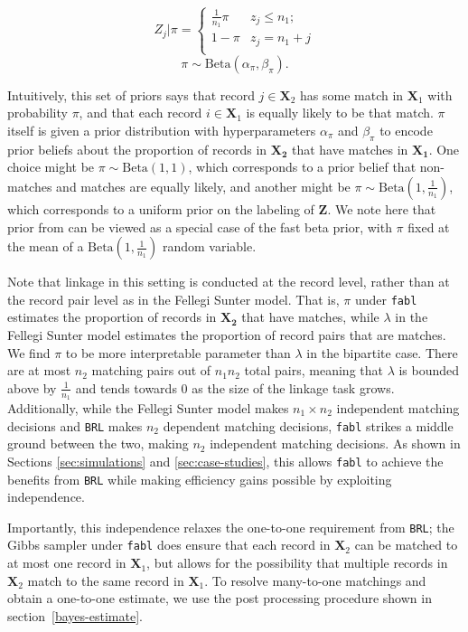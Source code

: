 \documentclass[ba]{imsart}
\begin{document}
$$Z_j | \pi =
\begin{cases} 
	\frac{1}{n_1}\pi  & z_j \leq n_1; \\
	1-\pi &  z_j  = n_1 + j \\
\end{cases}$$
$$\pi \sim \text{Beta}(\alpha_{\pi}, \beta_{\pi}).$$

Intuitively, this set of priors says that record $j \in \bm{X}_2$ has some match in $\bm{X}_1$ with probability $\pi$, and that each record $i \in \bm{X}_1$ is equally likely to be that match. $\pi$ itself is given a prior distribution with hyperparameters $\alpha_{\pi}$ and $\beta_{\pi}$ to encode prior beliefs about  the proportion of records in $\bm{X_2}$ that have matches in $\bm{X_1}$. One choice might be \(\pi \sim \text{Beta}(1, 1)\), which corresponds to a prior belief that non-matches and matches are equally likely, and another might be \(\pi \sim \text{Beta}\left(1, \frac{1}{n_1}\right)\), which corresponds to a uniform prior on the labeling of \(\bm{Z}\). We note here that prior from \cite{wortman2019} can be viewed as a special case of the fast beta prior, with $\pi$ fixed at the mean of a $\text{Beta}\left(1, \frac{1}{n_1}\right)$ random variable. 

Note that linkage in this setting is conducted at the record level, rather than at the record pair level as in the Fellegi Sunter model. That is, $\pi$ under \texttt{fabl} estimates the proportion of records in $\bm{X_2}$ that have matches, while $\lambda$ in the Fellegi Sunter model estimates the proportion of record pairs that are matches. We find $\pi$ to be more interpretable parameter than $\lambda$ in the bipartite case. There are at most $n_2$ matching pairs out of $n_1 n_2$ total pairs, meaning that $\lambda$ is bounded above by $\frac{1}{n_1}$ and tends towards 0 as the size of the linkage task grows. Additionally, while the Fellegi Sunter model makes $n_1 \times n_2$ independent matching decisions and \texttt{BRL} makes $n_2$ dependent matching decisions, \texttt{fabl} strikes a middle ground between the two, making $n_2$  independent matching decisions. As shown in Sections \ref{sec:simulations} and \ref{sec:case-studies}, this allows \texttt{fabl} to achieve the benefits from \texttt{BRL} while making efficiency gains possible by exploiting independence. 

Importantly, this independence relaxes the one-to-one requirement from \texttt{BRL}; the Gibbs sampler under \texttt{fabl} does ensure that each record in \(\bm{X}_2\) can be matched to at most one record in \(\bm{X}_1\), but allows for the possibility that multiple records in \(\bm{X}_2\) match to the same record in \(\bm{X}_1\). To resolve many-to-one matchings and obtain a one-to-one estimate, we use the post processing procedure shown in section~\ref{bayes-estimate}.
\end{document}
